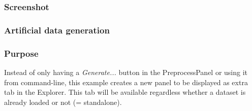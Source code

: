 \newpage
\subsubsection*{Screenshot}
\begin{center}
\end{center}

\newpage
\subsubsection*{Artificial data generation}
\subsubsection*{Purpose}
Instead of only having a \textit{Generate...} button in the PreprocessPanel or
using it from command-line, this example creates a new panel to be displayed as
extra tab in the Explorer. This tab will be available regardless whether a
dataset is already loaded or not (= standalone).

